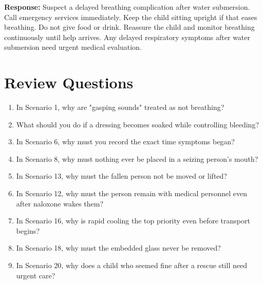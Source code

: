 \textbf{Response:} Suspect a delayed breathing complication after water submersion. Call emergency services immediately. Keep the child sitting upright if that eases breathing. Do not give food or drink. Reassure the child and monitor breathing continuously until help arrives. Any delayed respiratory symptoms after water submersion need urgent medical evaluation.

\section{Review Questions}

\begin{enumerate}[leftmargin=*]
\item In Scenario 1, why are "gasping sounds" treated as not breathing?
\item What should you do if a dressing becomes soaked while controlling bleeding?
\item In Scenario 6, why must you record the exact time symptoms began?
\item In Scenario 8, why must nothing ever be placed in a seizing person's mouth?
\item In Scenario 13, why must the fallen person not be moved or lifted?
\item In Scenario 12, why must the person remain with medical personnel even after naloxone wakes them?
\item In Scenario 16, why is rapid cooling the top priority even before transport begins?
\item In Scenario 18, why must the embedded glass never be removed?
\item In Scenario 20, why does a child who seemed fine after a rescue still need urgent care?
\end{enumerate}
